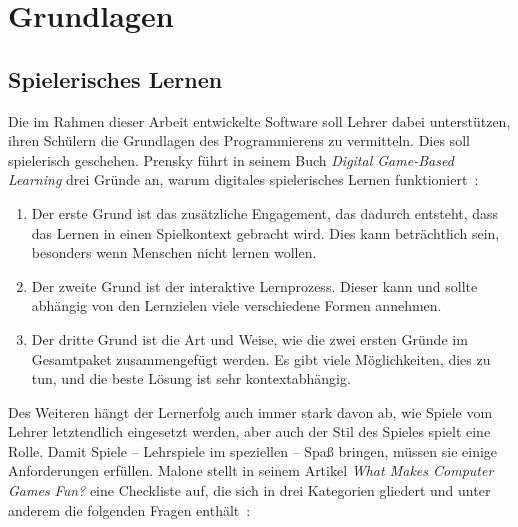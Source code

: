 \chapter{Grundlagen}
\label{sec:basics}

\section{Spielerisches Lernen}
\label{sec:basics:playful-learning}

Die im Rahmen dieser Arbeit entwickelte Software soll Lehrer dabei unterstützen, ihren Schülern die Grundlagen des Programmierens zu vermitteln. Dies soll spielerisch geschehen. Prensky führt in seinem Buch \textit{Digital Game-Based Learning} drei Gründe an, warum digitales spielerisches Lernen funktioniert~\cite[147]{prensky2007}:

\begin{enumerate}
    \item Der erste Grund ist das zusätzliche Engagement, das dadurch entsteht, dass das Lernen in einen Spielkontext gebracht wird. Dies kann beträchtlich sein, besonders wenn Menschen nicht lernen wollen.
    \item Der zweite Grund ist der interaktive Lernprozess. Dieser kann und sollte abhängig von den Lernzielen viele verschiedene Formen annehmen.
    \item Der dritte Grund ist die Art und Weise, wie die zwei ersten Gründe im Gesamtpaket zusammengefügt werden. Es gibt viele Möglichkeiten, dies zu tun, und die beste Lösung ist sehr kontextabhängig.
\end{enumerate}

Des Weiteren hängt der Lernerfolg auch immer stark davon ab, wie Spiele vom Lehrer letztendlich eingesetzt werden, aber auch der Stil des Spieles spielt eine Rolle. Damit Spiele -- Lehrspiele im speziellen -- Spaß bringen, müssen sie einige Anforderungen erfüllen. Malone stellt in seinem Artikel \textit{What Makes Computer Games Fun?} eine Checkliste auf, die sich in drei Kategorien gliedert und unter anderem die folgenden Fragen enthält~\cite[49]{malone1981}:


